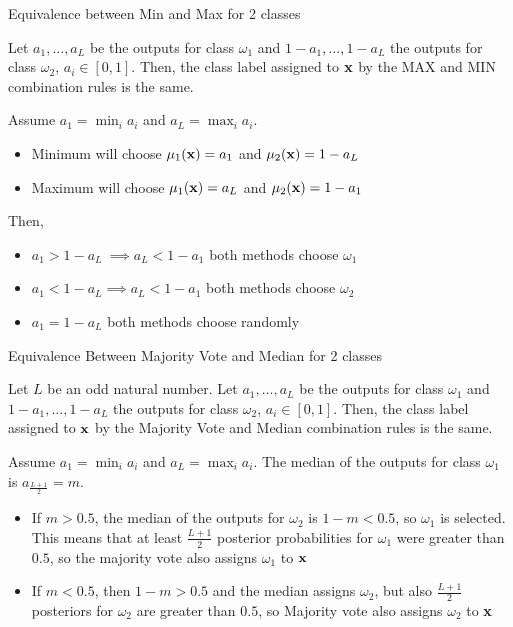 \documentclass[xcolor=table]{beamer}
\begin{document}
  \begin{frame}{Equivalence between Min and Max for 2 classes}
    \begin{proposition}
    Let \(a_1,\dots,a_L\) be the outputs for class \(\omega_1\) and \(1-a_1,\dots,1-a_L\) the outputs for class \(\omega_2\), \(a_i\in[0,1]\). Then, the class label assigned to \({\mathbf x}\) by the MAX and MIN combination rules is the same.
    \end{proposition}
    \pause
    Assume \(a_1 = \min_i a_i\) and \(a_L = \max_i a_i\). 
    \begin{itemize}
        \item Minimum will choose \(\mu_1({\mathbf x}) = a_1\) and \(\mu_2({\mathbf x}) = 1-a_L\)
        \item Maximum will choose \(\mu_1({\mathbf x}) = a_L\) and \(\mu_2({\mathbf x}) = 1-a_1\)
    \end{itemize}
    \pause
Then,
    \begin{itemize}
        \item \(a_1 > 1- a_L\ \implies a_L < 1- a_1\) both methods choose \(\omega_1\)
        \item \(a_1 < 1- a_L \implies a_L < 1- a_1\) both methods choose \(\omega _2\)
        \item \(a_1 = 1- a_L\) both methods choose randomly
    \end{itemize}
\end{frame}


\begin{frame}{Equivalence Between Majority Vote and Median for 2 classes}
    \begin{proposition}
    Let \(L\) be an odd natural number. Let \(a_1,\dots,a_L\) be the outputs for class \(\omega_1\) and \(1-a_1,\dots,1-a_L\) the outputs for class \(\omega_2\), \(a_i\in[0,1]\). Then, the class label assigned to \({\mathbf x}\) by the Majority Vote and Median combination rules is the same.
    \end{proposition}
    \pause
    Assume \(a_1 = \min_i a_i\) and \(a_L = \max_i a_i\). The median of the outputs for class \(\omega_1\) is \(a_{\frac{L+1}{2}} = m\).
    \begin{itemize}
        \item If \(m > 0.5\), the median of the outputs for \(\omega_2\) is \(1- m < 0.5\), so \(\omega_1\) is selected. This means that at least \(\frac{L+1}{2}\) posterior probabilities for \(\omega_1\) were greater than \(0.5\), so the majority vote also assigns \(\omega_1\) to \({\mathbf x}\)
        \item If \(m < 0.5\), then \(1- m > 0.5\) and the median assigns \(\omega_2\), but also \(\frac{L+1}{2}\) posteriors for \(\omega_2\) are greater than \(0.5\), so Majority vote also assigns \(\omega_2\) to \({\mathbf x}\)
    \end{itemize}
\end{frame}
\end{document}
